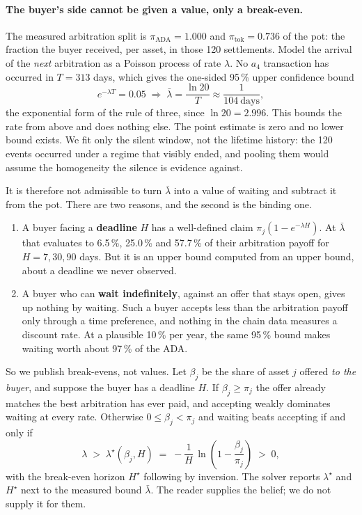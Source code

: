 \documentclass[11pt]{article}
\theoremstyle{remark}
\begin{document}
\paragraph{The buyer's side cannot be given a value, only a break-even.} The measured arbitration split is
$\pi_{\mathrm{ADA}} = 1.000$ and $\pi_{\mathrm{tok}} = 0.736$ of the pot: the fraction the buyer received, per asset,
in those 120 settlements. Model the arrival of the \emph{next} arbitration as a Poisson process of rate $\lambda$. No
$a_4$ transaction has occurred in $T = 313$ days, which gives the one-sided 95\,\% upper confidence bound
\[
e^{-\lambda T} = 0.05 \;\Longrightarrow\; \bar\lambda = \frac{\ln 20}{T} \approx \frac{1}{104\ \text{days}},
\]
the exponential form of the rule of three, since $\ln 20 = 2.996$. This bounds the rate from above and does nothing
else. The point estimate is zero and no lower bound exists. We fit only the silent window, not the lifetime history:
the 120 events occurred under a regime that visibly ended, and pooling them would assume the homogeneity the silence
is evidence against.

It is therefore not admissible to turn $\bar\lambda$ into a value of waiting and subtract it from the pot. There are
two reasons, and the second is the binding one.

\begin{enumerate}[leftmargin=*]
\item A buyer facing a \textbf{deadline} $H$ has a well-defined claim $\pi_j(1 - e^{-\lambda H})$. At $\bar\lambda$
that evaluates to 6.5\,\%, 25.0\,\% and 57.7\,\% of their arbitration payoff for $H = 7, 30, 90$ days. But it is an
upper bound computed from an upper bound, about a deadline we never observed.
\item A buyer who can \textbf{wait indefinitely}, against an offer that stays open, gives up nothing by waiting. Such
a buyer accepts less than the arbitration payoff only through a time preference, and nothing in the chain data
measures a discount rate. At a plausible 10\,\% per year, the same 95\,\% bound makes waiting worth about 97\,\% of
the ADA.
\end{enumerate}

So we publish break-evens, not values. Let $\beta_j$ be the share of asset $j$ offered \emph{to the buyer}, and
suppose the buyer has a deadline $H$. If $\beta_j \ge \pi_j$ the offer already matches the best arbitration has ever
paid, and accepting weakly dominates waiting at every rate. Otherwise $0 \le \beta_j < \pi_j$ and waiting beats
accepting if and only if
\[
\lambda \;>\; \lambda^{\star}(\beta_j, H) \;=\; -\frac{1}{H}\,\ln\!\left(1 - \frac{\beta_j}{\pi_j}\right) \;>\; 0 ,
\]
with the break-even horizon $H^{\star}$ following by inversion. The solver reports $\lambda^{\star}$ and $H^{\star}$
next to the measured bound $\bar\lambda$. The reader supplies the belief; we do not supply it for them.
\end{document}
